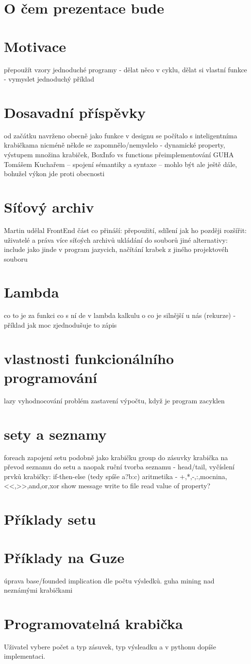\documentclass{article}
\author{Michal Kováč}
\begin{document}
\section{O čem prezentace bude}
\section{Motivace}
přepoužít vzory
jednoduché programy - dělat něco v cyklu, 
dělat si vlastní funkce - vymyslet jednoduchý příklad
\section{Dosavadní příspěvky}
od začátku navrženo obecně jako funkce
v designu se počítalo s inteligentníma krabičkama
nicméně někde se zapomnělo/nemyslelo - dynamické property, výstupem množina krabiček, BoxInfo vs functions
přeimplementování GUHA Tomášem Kuchařem -- spojení sémantiky a syntaxe -- mohlo být ale ještě dále, bohužel výkon jde proti obecnosti 
\section{Síťový archiv}
Martin udělal FrontEnd část
co přináší: přepoužití, sdílení
jak ho později rozšířit:
uživatelé a práva
více síťoých archivů
ukládání do souborů
jiné alternativy: include jako jinde v program jazycich, načítání krabek z jiného projektovéh souboru 
\section{Lambda}
co to je za funkci
co s ní de v lambda kalkulu
o co je silnější u nás (rekurze) - příklad jak moc zjednodušuje to zápis
\section{vlastnosti funkcionálního programování}
lazy vyhodnocování
problém zastavení výpočtu, když je program zacyklen
\section{sety a seznamy}
foreach
zapojení setu podobně jako krabičku group do zásuvky
krabička na převod seznamu do setu a naopak
ruční tvorba seznamu - head/tail, vyčíslení prvků
krabičky:
if-then-else (tedy spíše a?b:c)
aritmetika - +,*,-,:,mocnina,<<,>>,and,or,xor
show message
write to file
read value of property?
\section{Příklady setu}
\section{Příklady na Guze}
úprava base/founded implication dle počtu výsledků.
guha mining nad neznámými krabičkami
\section{Programovatelná krabička}
Uživatel vybere počet a typ zásuvek, typ výsleadku a v pythonu dopíše implementaci.
\end{document}

